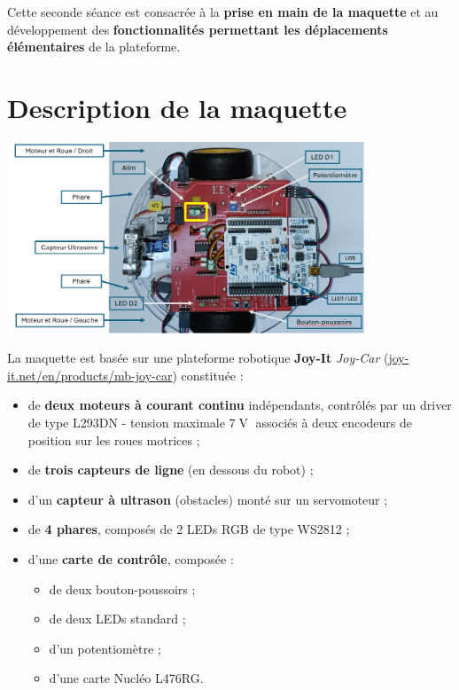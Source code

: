 \documentclass[a4paper,11pt,titlepage]{article} %
\begin{document}
Cette seconde séance est consacrée à la \textbf{prise en main de la maquette} et au développement des \textbf{fonctionnalités permettant les déplacements élémentaires} de la plateforme.


\section{Description de la maquette}

\begin{center}
	\includegraphics[width=0.8\textwidth]{images/robot_maquette.png}
\end{center}

La maquette est basée sur une plateforme robotique \textbf{Joy-It} \textit{Joy-Car} (\href{https://joy-it.net/en/products/mb-joy-car}{joy-it.net/en/products/mb-joy-car}) constituée :

\begin{itemize}
	\item de \textbf{deux moteurs à courant continu} indépendants, contrôlés par un driver de type L293DN - tension maximale $7\operatorname{V}$ associés à deux encodeurs de position sur les roues motrices ;
	\item de \textbf{trois capteurs de ligne} (en dessous du robot) ;
	\item d'un \textbf{capteur à ultrason} (obstacles) monté sur un servomoteur ;
	\item de \textbf{4 phares}, composés de 2 LEDs RGB de type WS2812 ;
	\item d'une \textbf{carte de contrôle}, composée :
	\begin{itemize}
		\item de deux bouton-poussoirs ;
		\item de deux LEDs standard ;
		\item d'un potentiomètre ;
		\item d'une carte Nucléo L476RG.
	\end{itemize}
\end{itemize}
\end{document}
